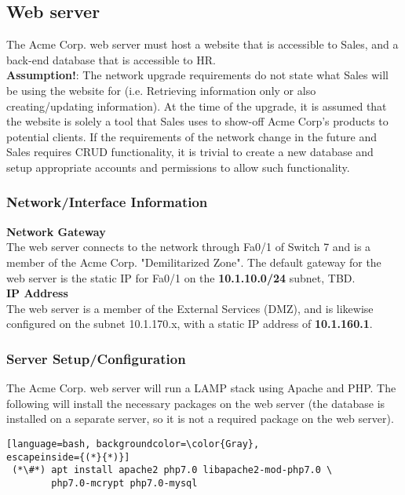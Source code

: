 \subsection{Web server}
The Acme Corp. web server must host a website that is accessible to Sales, and a 
back-end database that is accessible to HR. \\

\noindent
\textbf{Assumption!}: The network upgrade requirements do not state what Sales 
will be using the website for (i.e. Retrieving information only or also
creating/updating information). At the time of the upgrade, it is assumed that
the website is solely a tool that Sales uses to show-off Acme Corp's products 
to potential clients. If the requirements of the network change in the future 
and Sales requires CRUD functionality, it is trivial to create a new database 
and setup appropriate accounts and permissions to allow such functionality.

\subsubsection{Network/Interface Information}
\textbf{Network Gateway} \\
The web server connects to the network through Fa0/1 of Switch 7 and is a 
member of the Acme Corp. "Demilitarized Zone". The default gateway for the web 
server is the static IP for Fa0/1 on the \textbf{10.1.10.0/24} subnet, TBD. \\

\noindent
\textbf{IP Address} \\
The web server is a member of the External Services (DMZ), and is likewise
configured on the subnet 10.1.170.x, with a static IP address of
\textbf{10.1.160.1}.

\subsubsection{Server Setup/Configuration}
The Acme Corp. web server will run a LAMP stack using Apache and PHP. The
following will install the necessary packages on the web server (the database 
is installed on a separate server, so it is not a required package on the web
server). \\

\begin{lstlisting}[language=bash, backgroundcolor=\color{Gray}, 
escapeinside={(*}{*)}]
 (*\#*) apt install apache2 php7.0 libapache2-mod-php7.0 \
        php7.0-mcrypt php7.0-mysql
\end{lstlisting}
\vspace{1em}

